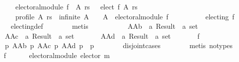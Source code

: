 \begin{isabellebody}
\ \ \ \ \ \ \ \ {\isasymnot}\ electoral{\isacharunderscore}{\kern0pt}module\ f{\isacharparenright}{\kern0pt}\ {\isasymand}\ {\isacharparenleft}{\kern0pt}{\isacharparenleft}{\kern0pt}{\isasymforall}A\ rs{\isachardot}{\kern0pt}\ {\isacharbraceleft}{\kern0pt}{\isacharbraceright}{\kern0pt}\ {\isasymnoteq}\ elect\ f\ A\ rs\ {\isasymor}\isanewline
\ \ \ \ \ \ \ \ {\isasymnot}\ profile\ A\ rs\ {\isasymor}\ infinite\ A\ {\isasymor}\ {\isacharbraceleft}{\kern0pt}{\isacharbraceright}{\kern0pt}\ {\isacharequal}{\kern0pt}\ A{\isacharparenright}{\kern0pt}\ {\isasymand}\ electoral{\isacharunderscore}{\kern0pt}module\ f\ {\isasymor}\isanewline
\ \ \ \ \ \ \ \ {\isasymnot}\ electing\ f{\isacharparenright}{\kern0pt}{\isachardoublequoteclose}\isanewline
\ \ \ \ \ \ \isamarkupfalse%
\ electing{\isacharunderscore}{\kern0pt}def\isanewline
\ \ \ \ \ \ \isamarkupfalse%
\ metis\isanewline
\ \ \ \ \isamarkupfalse%
\isanewline
\ \ \ \ \ \ AAb\ {\isacharcolon}{\kern0pt}{\isacharcolon}{\kern0pt}\ {\isachardoublequoteopen}{\isacharprime}{\kern0pt}a\ Result\ {\isasymRightarrow}\ {\isacharprime}{\kern0pt}a\ set{\isachardoublequoteclose}\ \isanewline
\ \ \ \ \ \ AAc\ {\isacharcolon}{\kern0pt}{\isacharcolon}{\kern0pt}\ {\isachardoublequoteopen}{\isacharprime}{\kern0pt}a\ Result\ {\isasymRightarrow}\ {\isacharprime}{\kern0pt}a\ set{\isachardoublequoteclose}\ \isanewline
\ \ \ \ \ \ AAd\ {\isacharcolon}{\kern0pt}{\isacharcolon}{\kern0pt}\ {\isachardoublequoteopen}{\isacharprime}{\kern0pt}a\ Result\ {\isasymRightarrow}\ {\isacharprime}{\kern0pt}a\ set{\isachardoublequoteclose}\ \isanewline
\ \ \ \ \ \ f{}{\isacharcolon}{\kern0pt}\isanewline
\ \ \ \ \ \ {\isachardoublequoteopen}{\isasymforall}p{\isachardot}{\kern0pt}\ {\isacharparenleft}{\kern0pt}AAb\ p{\isacharcomma}{\kern0pt}\ AAc\ p{\isacharcomma}{\kern0pt}\ AAd\ p{\isacharparenright}{\kern0pt}\ {\isacharequal}{\kern0pt}\ p{\isachardoublequoteclose}\isanewline
\ \ \ \ \ \ \isamarkupfalse%
\ disjoint{}{\isachardot}{\kern0pt}cases\isanewline
\ \ \ \ \ \ \isamarkupfalse%
\ {\isacharparenleft}{\kern0pt}metis\ {\isacharparenleft}{\kern0pt}no{\isacharunderscore}{\kern0pt}types{\isacharparenright}{\kern0pt}{\isacharparenright}{\kern0pt}\isanewline
\ \ \ \ \isamarkupfalse%
\ f{}{\isacharcolon}{\kern0pt}\isanewline
\ \ \ \ \ \ {\isachardoublequoteopen}electoral{\isacharunderscore}{\kern0pt}module\ {\isacharparenleft}{\kern0pt}elector\ m{\isacharparenright}{\kern0pt}{\isachardoublequoteclose}\isanewline

\end{isabellebody}
